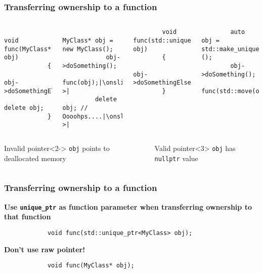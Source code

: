 \documentclass{beamer}
\begin{document}
\begin{frame}[fragile,t]
\frametitle{Transferring ownership to a function}
	\begin{columns}[T]
		\begin{lstlisting}
			void func(MyClass* obj)
			{
				obj->doSomethingElse();
				delete obj;
			}
		\end{lstlisting}
		\begin{lstlisting}
			MyClass* obj = new MyClass();
			obj->doSomething();
			func(obj);|\onslide<2->|
         delete obj; // Oooohps....|\onslide<1->|
		\end{lstlisting}

    \begin{lstlisting}
        void func(std::unique_ptr<MyClass> obj)
        {
            obj->doSomethingElse();		
        }
    \end{lstlisting}
    \begin{lstlisting}
        auto obj = std::make_unique<MyClass>();
        obj->doSomething();
        func(std::move(obj));		
    \end{lstlisting}
	\end{columns}

	\begin{columns}[T]
        \begin{alertblock}{Invalid pointer}<2->
            \texttt{obj} points to deallocated memory
        \end{alertblock}
        \begin{block}{Valid pointer}<3>
            \texttt{obj} has \texttt{nullptr} value
        \end{block}
	\end{columns}
\end{frame}

\begin{frame}[fragile,t]
\frametitle{Transferring ownership to a function}
	\textbf{Use \texttt{unique\_ptr} as function parameter when transferring
		    ownership to that function}
	\begin{example}
		\begin{lstlisting}
			void func(std::unique_ptr<MyClass> obj);
		\end{lstlisting}
	\end{example}
	\textbf{Don't use raw pointer!}
	\begin{example}
		\begin{lstlisting}
			void func(MyClass* obj);
		\end{lstlisting}
	\end{example}
\end{frame}
\end{document}

